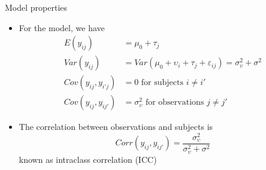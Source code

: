 \documentclass[aspectratio=169]{beamer}
\begin{document}
\begin{frame}{Model properties}
  \begin{itemize}
    \item For the model, we have
\begin{align*}
  E(y_{ij})   &= \mu_0 + \tau_j \\
  Var(y_{ij}) &= Var(\mu_0 + \upsilon_i + \tau_j + \varepsilon_{ij})
               = \sigma^2_\upsilon + \sigma^2 \\
  Cov(y_{ij}, y_{i'j}) &= 0 \text{ for subjects } i \neq i' \\
  Cov(y_{ij}, y_{ij'}) &= \sigma^2_\upsilon \text{ for observations }
                          j \neq j'
\end{align*}
      \vspace{-.6cm}
\item The correlation between observations and subjects is
\[
  Corr(y_{ij}, y_{ij'}) = \frac{\sigma^2_\upsilon}{\sigma^2_\upsilon +
    \sigma^2}
\]
known as intraclass correlation (ICC)
  \end{itemize}
\end{frame}
\end{document}
